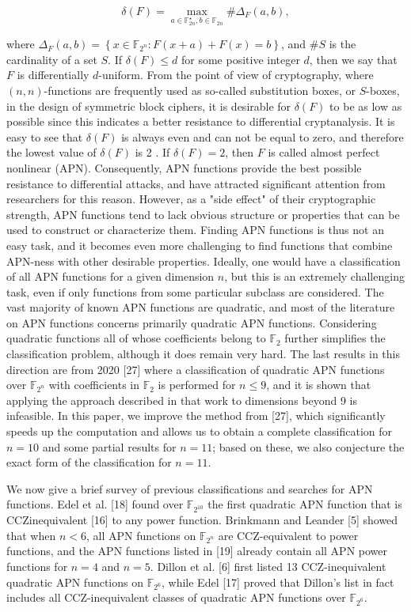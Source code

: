 \documentclass[10pt]{article}
\begin{document}
$$
\delta(F)=\max _{a \in \mathbb{F}_{2 n}^{\star}, b \in \mathbb{F}_{2 n}} \# \Delta_{F}(a, b),
$$

where $\Delta_{F}(a, b)=\left\{x \in \mathbb{F}_{2^{n}}: F(x+a)+F(x)=b\right\}$, and $\# S$ is the cardinality of a set $S$. If $\delta(F) \leq d$ for some positive integer $d$, then we say that $F$ is differentially $d$-uniform. From the point of view of cryptography, where $(n, n)$-functions are frequently used as so-called substitution boxes, or $S$-boxes, in the design of symmetric block ciphers, it is desirable for $\delta(F)$ to be as low as possible since this indicates a better resistance to differential cryptanalysis. It is easy to see that $\delta(F)$ is always even and can not be equal to zero, and therefore the lowest value of $\delta(F)$ is 2 . If $\delta(F)=2$, then $F$ is called almost perfect nonlinear (APN). Consequently, APN functions provide the best possible resistance to differential attacks, and have attracted significant attention from researchers for this reason. However, as a "side effect" of their cryptographic strength, APN functions tend to lack obvious structure or properties that can be used to construct or characterize them. Finding APN functions is thus not an easy task, and it becomes even more challenging to find functions that combine APN-ness with other desirable properties. Ideally, one would have a classification of all APN functions for a given dimension $n$, but this is an extremely challenging task, even if only functions from some particular subclass are considered. The vast majority of known APN functions are quadratic, and most of the literature on APN functions concerns primarily quadratic APN functions. Considering quadratic functions all of whose coefficients belong to $\mathbb{F}_{2}$ further simplifies the classification problem, although it does remain very hard. The last results in this direction are from 2020 [27] where a classification of quadratic APN functions over $\mathbb{F}_{2^{n}}$ with coefficients in $\mathbb{F}_{2}$ is performed for $n \leq 9$, and it is shown that applying the approach described in that work to dimensions beyond 9 is infeasible. In this paper, we improve the method from [27], which significantly speeds up the computation and allows us to obtain a complete classification for $n=10$ and some partial results for $n=11$; based on these, we also conjecture the exact form of the classification for $n=11$.

We now give a brief survey of previous classifications and searches for APN functions. Edel et al. [18] found over $\mathbb{F}_{2^{10}}$ the first quadratic APN function that is CCZinequivalent [16] to any power function. Brinkmann and Leander [5] showed that when $n<6$, all APN functions on $\mathbb{F}_{2^{n}}$ are CCZ-equivalent to power functions, and the APN functions listed in [19] already contain all APN power functions for $n=4$ and $n=5$. Dillon et al. [6] first listed 13 CCZ-inequivalent quadratic APN functions on $\mathbb{F}_{2^{6}}$, while Edel [17] proved that Dillon's list in fact includes all CCZ-inequivalent classes of quadratic APN functions over $\mathbb{F}_{2^{6}}$.
\end{document}
